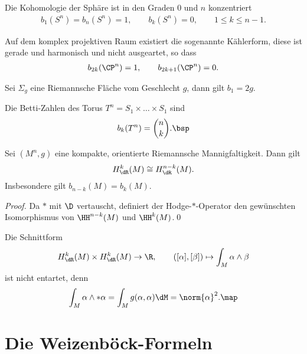 \documentclass[%
	paper=a5,%
	fleqn,%
	DIV=18,%
	BCOR=0mm,
	fontsize=11pt,
	titlepage=false,%
	bibliography=totoc,
	DIV=18,%
	twoside=true,
	pdftitle=Riemannsche Geometrie,
	pdfauthor=Uwe Semmelmann,
	numbers=noendperiod]%
	{scrbook}
\begin{document}
\begin{ex}
\begin{exenum}
\item Die Kohomologie der Sphäre ist in den Graden $0$ und $n$ konzentriert
\begin{align*}
b_{1}(S^n)=b_{n}(S^n) = 1,\qquad b_{k}(S^n) = 0,\qquad 1\le k\le n-1.
\end{align*}
\item Auf dem komplex projektiven Raum existiert die sogenannte Kählerform, diese ist gerade und harmonisch und nicht ausgeartet, so dass
\begin{align*}
b_{2k}(\CP^n) = 1,\qquad b_{2k+1}(\CP^n) =0.
\end{align*}
\item Sei $\Sigma_{g}$ eine Riemannsche Fläche vom Geschlecht $g$, dann gilt $b_{1} = 2g$.
\item Die Betti-Zahlen des Torus $T^n = S_{1}\times \ldots \times S_{1}$ sind
\begin{align*}
b_{k}(T^n) = \binom{n}{k}.\bsp
\end{align*}
\end{exenum}
\end{ex}

\begin{cor}
Sei $(M^n,g)$ eine kompakte, orientierte Riemannsche Mannigfaltigkeit. Dann gilt
\begin{align*}
H_{\dR}^k(M) \cong H_{\dR}^{n-k}(M).
\end{align*}
Insbesondere gilt $b_{n-k}(M) = b_{k}(M)$.\fish
\end{cor}

\begin{proof}
Da $*$ mit $\D$ vertauscht, definiert der Hodge-$*$-Operator den gewünschten Isomorphismus von $\HH^{n-k}(M)$ und $\HH^k(M)$.\qed
\end{proof}

\begin{rem}
Die Schnittform
\begin{align*}
H_{\dR}^k(M)\times H_{\dR}^k(M)\to \R,\qquad
([\alpha],[\beta]) \mapsto \int_{M} \alpha\wedge \beta
\end{align*}
ist nicht entartet, denn\begin{align*}
\int_{M}\alpha\wedge *\alpha =  \int_{M} g(\alpha,\alpha)\dM = \norm{\alpha}^2.\map
\end{align*}
\end{rem}

\section{Die Weizenböck-Formeln}
\end{document}
